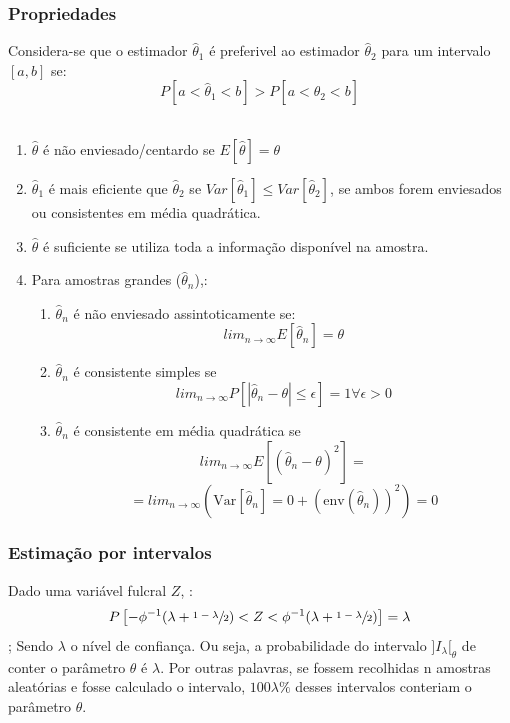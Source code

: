 \documentclass[a4paper]{article}
\newcommand{\estimador}{\hat{\theta}}
\begin{document}
\begin{multicols}{3}
\subsubsection{Propriedades}
Considera-se que o estimador $\estimador_1$ é preferivel ao estimador $\estimador_2$ para um intervalo $[a, b]$ se:
$$P[a < \estimador_1 < b] > P[a < \estimador_2 < b]$$ \\
\begin{enumerate}
  \item[] $\estimador$ é não enviesado/centardo se $E[\estimador] = \theta$
  \item[] $\estimador_1$ é mais eficiente que $\estimador_2$ se $Var  [\estimador_1] \leq Var[\estimador_2]$, se ambos forem enviesados ou consistentes em média quadrática. \\
  \item[] $\estimador$ é suficiente se utiliza toda a informação disponível na  amostra. \\
  \item[] Para amostras grandes ($\estimador_n$),:
  \begin{enumerate}
    \item[] $\estimador_n$ é não enviesado assintoticamente se: $$lim_{n \to \infty} E[\estimador_n] = \theta$$
    \item[] $\estimador_n$ é consistente simples se $$lim_{n \to \infty} P[\left| \estimador_n - \theta \right| \leq \epsilon] = 1 \forall \epsilon > 0$$
    \item[] $\estimador_n$ é consistente em média quadrática se $$lim_{n \to \infty} E\left[\left(\estimador_n - \theta\right)^2\right] =$$ $$= lim_{n \to \infty}\left( \text{Var}[\estimador_n] = 0 + \left(\text{env}(\estimador_n)\right)^2\right) = 0$$
  \end{enumerate}
\end{enumerate}
\subsubsection{Estimação por intervalos}
Dado uma variável fulcral $Z$, :
$$P\left[-\phi^{-1}(\lambda + \sfrac{1 - \lambda}{2}) < Z < \phi^{-1}(\lambda + \sfrac{1 - \lambda}{2})\right] = \lambda$$
; Sendo $\lambda$ o nível de confiança. Ou seja, a probabilidade do intervalo $]I_{\lambda}[_\theta$ de conter o parâmetro $\theta$ é $\lambda$. Por outras palavras, se fossem recolhidas n amostras aleatórias e fosse calculado o intervalo, $100\lambda\%$ desses intervalos conteriam o parâmetro $\theta$. \\

\end{multicols}
\end{document}
